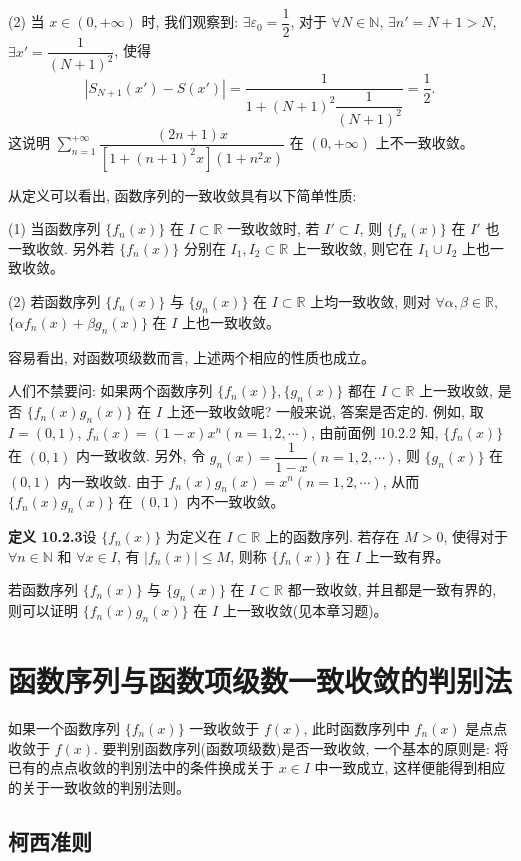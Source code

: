 \documentclass[UTF8,12pt,a4paper,fontset=fandol]{ctexart}
\begin{document}
(2) 当 $x\in(0,+\infty)$ 时, 我们观察到: $\exists\varepsilon_0=\dfrac12$, 对于 $\forall N\in\mathbb N$, $\exists n'=N+1>N$, $\exists x'=\dfrac1{(N+1)^2}$, 使得
\[
  |S_{N+1}(x')-S(x')|=\frac1{1+(N+1)^2\dfrac1{(N+1)^2}}=\frac12.
\]
这说明 $\sum\limits_{n=1}^{+\infty}\dfrac{(2n+1)x}{[1+(n+1)^2x](1+n^2x)}$ 在 $(0,+\infty)$ 上不一致收敛。

从定义可以看出, 函数序列的一致收敛具有以下简单性质:

(1) 当函数序列 $\{f_n(x)\}$ 在 $I\subset\mathbb R$ 一致收敛时, 若 $I'\subset I$, 则 $\{f_n(x)\}$ 在 $I'$ 也一致收敛. 另外若 $\{f_n(x)\}$ 分别在 $I_1,I_2\subset\mathbb R$ 上一致收敛, 则它在 $I_1\cup I_2$ 上也一致收敛。

(2) 若函数序列 $\{f_n(x)\}$ 与 $\{g_n(x)\}$ 在 $I\subset\mathbb R$ 上均一致收敛, 则对 $\forall\alpha,\beta\in\mathbb R$, $\{\alpha f_n(x)+\beta g_n(x)\}$ 在 $I$ 上也一致收敛。

容易看出, 对函数项级数而言, 上述两个相应的性质也成立。

人们不禁要问: 如果两个函数序列 $\{f_n(x)\},\{g_n(x)\}$ 都在 $I\subset\mathbb R$ 上一致收敛, 是否 $\{f_n(x)g_n(x)\}$ 在 $I$ 上还一致收敛呢? 一般来说, 答案是否定的. 例如, 取 $I=(0,1)$, $f_n(x)=(1-x)x^n(n=1,2,\cdots)$, 由前面例 10.2.2 知, $\{f_n(x)\}$ 在 $(0,1)$ 内一致收敛. 另外, 令 $g_n(x)=\dfrac1{1-x}(n=1,2,\cdots)$, 则 $\{g_n(x)\}$ 在 $(0,1)$ 内一致收敛. 由于 $f_n(x)g_n(x)=x^n(n=1,2,\cdots)$, 从而 $\{f_n(x)g_n(x)\}$ 在 $(0,1)$ 内不一致收敛。

\noindent\textbf{定义 10.2.3}\quad 设 $\{f_n(x)\}$ 为定义在 $I\subset\mathbb R$ 上的函数序列. 若存在 $M>0$, 使得对于 $\forall n\in\mathbb N$ 和 $\forall x\in I$, 有 $|f_n(x)|\leq M$, 则称 $\{f_n(x)\}$ 在 $I$ 上一致有界。

若函数序列 $\{f_n(x)\}$ 与 $\{g_n(x)\}$ 在 $I\subset\mathbb R$ 都一致收敛, 并且都是一致有界的, 则可以证明 $\{f_n(x)g_n(x)\}$ 在 $I$ 上一致收敛(见本章习题)。

\section{函数序列与函数项级数一致收敛的判别法}

如果一个函数序列 $\{f_n(x)\}$ 一致收敛于 $f(x)$, 此时函数序列中 $f_n(x)$ 是点点收敛于 $f(x)$. 要判别函数序列(函数项级数)是否一致收敛, 一个基本的原则是: 将已有的点点收敛的判别法中的条件换成关于 $x\in I$ 中一致成立, 这样便能得到相应的关于一致收敛的判别法则。

\subsection{柯西准则}
\end{document}
